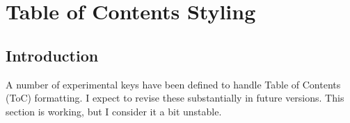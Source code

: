 \chapter[toc]{Table of Contents Styling}

 \newcommand*{\pkg}[1]{\textsf{\textcolor{thepackage}{#1}}\index{#1}}
\def\precis#1{%
\bgroup
\small
\smallskip\parindent0pt
#1\par\medskip\egroup
\addtocontents{toc}{{\smallskip\leftskip30pt\rightskip100pt\parindent0pt#1\medskip}}%
}
\precis{\protect\lorem}

\section{Introduction}
A number of experimental keys have been defined to handle Table of Contents (ToC) formatting. I expect to revise these substantially in future versions. This section is working, but I consider it a bit unstable.
\bigskip

